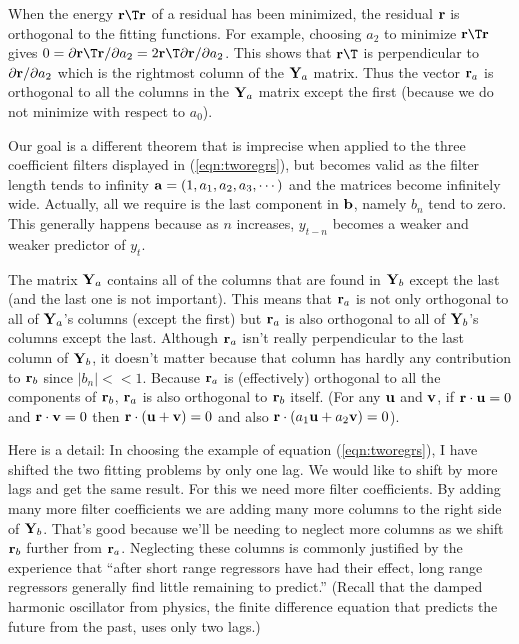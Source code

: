 When the energy $\bold r\T\bold r$
of a residual has been minimized,
the residual $\bold r$ is orthogonal to the fitting functions.
For example, choosing $a_2$ to minimize
$\bold r\T\bold r$
gives
$0=\partial\bold r\T\bold r/\partial a_2=2\bold r\T\partial\bold r/\partial a_2$.
This shows that $\bold r\T$ is perpendicular to $\partial \bold r / \partial a_2$
which is the rightmost column of the $\bold Y_a$ matrix.
Thus the vector $\bold r_a$
is orthogonal to all the columns in the $\bold Y_a$ matrix
except the first (because we do not minimize with respect to $a_0$).

\par
Our goal is a different theorem that is imprecise when applied
to the three coefficient filters displayed in (\ref{eqn:tworegrs}),
but becomes valid as the filter length tends to infinity
$\bold a = (1,a_1, a_2, a_3,\cdots)$
and the matrices become infinitely wide.
Actually, all we require is the last component in $\bold b$,
namely $b_n$ tend to zero.
This generally happens because as $n$ increases,
$y_{t-n}$ becomes a weaker and weaker predictor of $y_t$.

\par
The matrix $\bold Y_a$ contains
all of the columns that are found in $\bold Y_b$
except the last (and the last one is not important).
This means that $\bold r_a$ is not only orthogonal to all
of $\bold Y_a$'s columns (except the first)
but $\bold r_a$ is also orthogonal to all of
$\bold Y_b$'s columns except the last.
Although $\bold r_a$ isn't really perpendicular to the last column
of $\bold Y_b$, it doesn't matter because that column
has hardly any contribution to $\bold r_b$
since $|b_n|<<1$.
Because $\bold r_a$ is (effectively)
orthogonal to all the components of $\bold r_b$,
$\bold r_a$ is also orthogonal to $\bold r_b$ itself.
(For any $\bold u$ and $\bold v$, if
$\bold r\cdot \bold u=0$ and
$\bold r\cdot \bold v=0$ then
$\bold r\cdot (\bold u+ \bold v)=0$ and also
$\bold r\cdot (a_1\bold u + a_2\bold v)=0$).
\par
Here is a detail:
In choosing the example of equation (\ref{eqn:tworegrs}),
I have shifted the two fitting problems by only one lag.
We would like to shift by more lags and get the same result.
For this we need more filter coefficients.
By adding many more filter coefficients we are adding many more columns
to the right side of $\bold Y_b$.
That's good because we'll be needing to neglect more columns
as we shift $\bold r_b$ further from $\bold r_a$.
Neglecting these columns is commonly justified by the experience
that ``after short range regressors have had their effect,
long range regressors generally find little remaining to predict.''
(Recall that the damped harmonic oscillator from physics,
the finite difference equation that predicts the future from the past,
uses only two lags.)


